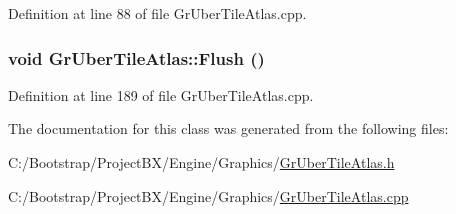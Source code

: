 Definition at line 88 of file GrUberTileAtlas.cpp.\hypertarget{class_gr_uber_tile_atlas_7f8f26f18099306cc92e8646319a9586}{
\subsubsection[{Flush}]{\setlength{\rightskip}{0pt plus 5cm}void GrUberTileAtlas::Flush ()}}
\label{class_gr_uber_tile_atlas_7f8f26f18099306cc92e8646319a9586}




Definition at line 189 of file GrUberTileAtlas.cpp.

The documentation for this class was generated from the following files:\begin{CompactItemize}
\item 
C:/Bootstrap/ProjectBX/Engine/Graphics/\hyperlink{_gr_uber_tile_atlas_8h}{GrUberTileAtlas.h}\item 
C:/Bootstrap/ProjectBX/Engine/Graphics/\hyperlink{_gr_uber_tile_atlas_8cpp}{GrUberTileAtlas.cpp}\end{CompactItemize}
